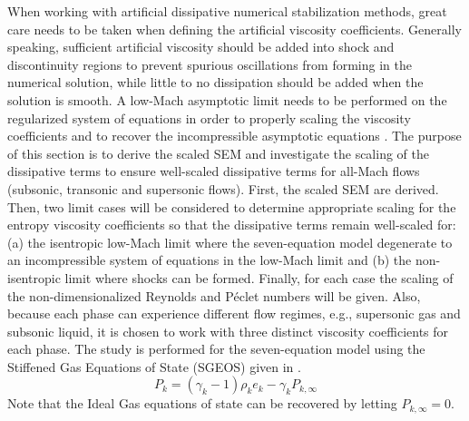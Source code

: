\documentclass[preprint,10pt]{elsarticle}
\begin{document}
When working with artificial dissipative numerical stabilization methods, great care needs to be taken when defining the artificial viscosity coefficients. Generally speaking, sufficient artificial viscosity should be added into shock and discontinuity regions to prevent spurious oscillations from forming in the numerical solution, while little to no dissipation should be added when the solution is smooth.
A low-Mach asymptotic limit needs to be performed on the regularized system of equations in order to properly scaling the viscosity coefficients and to recover the incompressible asymptotic equations \cite{LowMach1, LowMach2, LowMach3}. The purpose of this section is to derive the scaled SEM and investigate the scaling of the dissipative terms to ensure well-scaled dissipative terms for all-Mach flows (subsonic, transonic and supersonic flows). First, the scaled SEM are derived. Then, two limit cases will be considered to determine appropriate scaling for the entropy 
viscosity coefficients so that the dissipative terms remain well-scaled for: 
(a) the isentropic low-Mach limit where the seven-equation model degenerate to an incompressible system of 
equations in the low-Mach limit and (b) the non-isentropic limit where shocks can be formed. 
Finally, for each case the scaling of the non-dimensionalized Reynolds and P\'eclet numbers will be given. Also, because each phase can experience different flow regimes, e.g., supersonic gas and subsonic liquid, it is chosen to work with three distinct viscosity coefficients for each phase. The study is performed for the seven-equation model using the Stiffened Gas Equations of State (SGEOS) given in .
%
\begin{equation}\label{eq:SGEOS_bis}
P_k = \left( \gamma_k-1 \right) \rho_k e_k - \gamma_k P_{k,\infty}
\end{equation}
Note that the Ideal Gas equations of state can be recovered by letting $P_{k,\infty}=0$.
%
\end{document}

